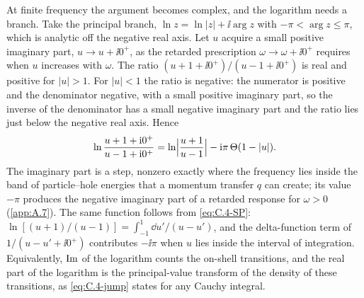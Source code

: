 At finite frequency the argument becomes complex, and the logarithm needs a branch. Take the principal branch, $\ln z = \ln|z| + \ii\arg z$ with $-\pi < \arg z \le \pi$, which is analytic off the negative real axis. Let $u$ acquire a small positive imaginary part, $u \to u + \ii0^+$, as the retarded prescription $\omega \to \omega + \ii0^+$ requires when $u$ increases with $\omega$. The ratio $(u + 1 + \ii0^+)/(u - 1 + \ii0^+)$ is real and positive for $|u| > 1$. For $|u| < 1$ the ratio is negative: the numerator is positive and the denominator negative, with a small positive imaginary part, so the inverse of the denominator has a small negative imaginary part and the ratio lies just below the negative real axis. Hence
\begin{equation}
  \ln\frac{u + 1 + \mathrm{i}0^+}{u - 1 + \mathrm{i}0^+} = \ln\Bigl|\frac{u + 1}{u - 1}\Bigr| - \mathrm{i}\pi\,\Theta(1 - |u|) .
  \label{eq:C.8-branch}
\end{equation}
The imaginary part is a step, nonzero exactly where the frequency lies inside the band of particle--hole energies that a momentum transfer $q$ can create; its value $-\pi$ produces the negative imaginary part of a retarded response for $\omega > 0$ (\cref{app:A.7}). The same function follows from \cref{eq:C.4-SP}: $\ln[(u + 1)/(u - 1)] = \int_{-1}^{1}\dd u'/(u - u')$, and the delta-function term of $1/(u - u' + \ii0^+)$ contributes $-\ii\pi$ when $u$ lies inside the interval of integration. Equivalently, $\operatorname{Im}$ of the logarithm counts the on-shell transitions, and the real part of the logarithm is the principal-value transform of the density of these transitions, as \cref{eq:C.4-jump} states for any Cauchy integral.
